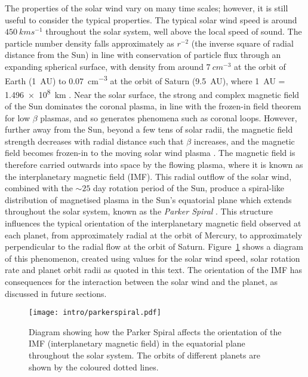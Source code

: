The properties of the solar wind vary on many time scales; however, it is still useful to consider the typical properties. The typical solar wind speed is around $\SI{450}{kms^{-1}}$ throughout the solar system, well above the local speed of sound. The particle number density falls approximately as $r^{-2}$ (the inverse square of radial distance from the Sun) in line with conservation of particle flux through an expanding spherical surface, with density from around $\SI{7}{cm^{-3}}$ at the orbit of Earth (\SI{1}{AU}) to \SI{0.07}{cm^{-3}} at the orbit of Saturn (\SI{9.5}{AU}), where \SI{1}{AU} = \SI{1.496e8}{km} \citep{bagenal2014}. Near the solar surface, the strong and complex magnetic field of the Sun dominates the coronal plasma, in line with the frozen-in field theorem for low $\beta$ plasmas, and so generates phenomena such as coronal loops. However, further away from the Sun, beyond a few tens of solar radii, the magnetic field strength decreases with radial distance such that $\beta$ increases, and the magnetic field becomes frozen-in to the moving solar wind plasma \citep{russell2016}. The magnetic field is therefore carried outwards into space by the flowing plasma, where it is known as the interplanetary magnetic field (IMF). This radial outflow of the solar wind, combined with the ${\sim}25$ day rotation period of the Sun, produce a spiral-like distribution of magnetised plasma in the Sun's equatorial plane which extends throughout the solar system, known as the \textit{Parker Spiral} \citep{parker1958}. This structure influences the typical orientation of the interplanetary magnetic field observed at each planet, from approximately radial at the orbit of Mercury, to approximately perpendicular to the radial flow at the orbit of Saturn. Figure~\ref{intro:fig:parkerspiral} shows a diagram of this phenomenon, created using values for the solar wind speed, solar rotation rate and planet orbit radii as quoted in this text. The orientation of the IMF has consequences for the interaction between the solar wind and the planet, as discussed in future sections.

\begin{figure}
\centering
\noindent\texttt{[image: intro/parkerspiral.pdf]}
\caption[Diagram of the Parker Spiral throughout the solar system.]{Diagram showing how the Parker Spiral affects the orientation of the IMF (interplanetary magnetic field) in the equatorial plane throughout the solar system. The orbits of different planets are shown by the coloured dotted lines.}
\label{intro:fig:parkerspiral}
\end{figure}


